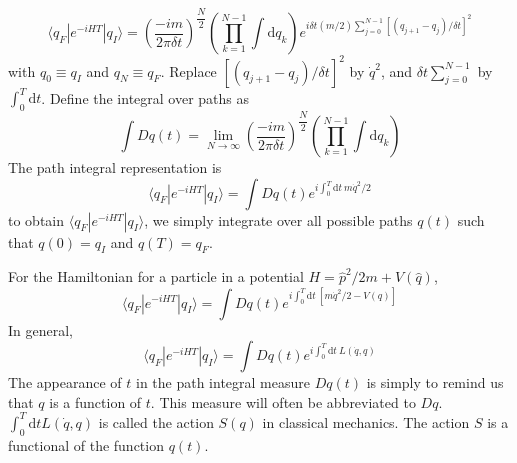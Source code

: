 \documentclass[11pt,a4paper]{article}
\newcommand{\dif}{\mathrm{d}}
\begin{document}
\begin{equation}
\langle q_F |e^{-iHT}| q_I\rangle = \left(\dfrac{-i m}{2\pi \delta t} \right)^{\dfrac{N}{2} } \left(\prod_{k=1}^{N-1} \int \dif q_k \right) e^{i\delta t(m/2)\sum\limits_{j=0}^{N-1}[(q_{j+1}-q_{j})/\delta t]^2}
\end{equation}
with $q_0 \equiv q_I$ and $q_N \equiv q_F$. Replace $[(q_{j+1}-q_j)/\delta t]^2$ by $\dot{q}^2$, and $\delta t \sum_{j=0}^{N-1}$ by $\int_0^T \dif t$. Define the integral over paths as
\begin{equation*}
\int D q(t) = \lim_{N \rightarrow \infty} \left(\dfrac{-i m}{2\pi \delta t} \right)^{\dfrac{N}{2} } \left(\prod_{k=1}^{N-1} \int \dif q_k \right)
\end{equation*}
The path integral representation is
\begin{equation}
\langle q_F |e^{-iHT}| q_I\rangle = \int D q(t) e^{i \int_0^T \dif t ~m \dot{q}^2/2}
\end{equation}
to obtain $\langle q_F |e^{-iHT}| q_I\rangle$, we simply integrate over all possible paths $q(t)$ such that $q(0) = q_I$ and $q(T) = q_F$.

For the Hamiltonian for a particle in a potential $H = \hat{p}^2/2m + V(\hat{q})$, 
\begin{equation}
\langle q_F |e^{-iHT}| q_I\rangle = \int D q(t) e^{i \int_0^T \dif t ~[m \dot{q}^2/2 -V(q)]}
\end{equation}
In general, 
\begin{equation}
\langle q_F |e^{-iHT}| q_I\rangle = \int D q(t) e^{i \int_0^T \dif t ~L(\dot{q}, q)}
\end{equation}
The appearance of $t$ in the path integral measure $Dq(t)$ is simply to remind us that $q$ is a function of $t$. This measure will often be abbreviated to $Dq$. $\int_0^T \dif t L(\dot{q}, q)$ is called the action $S(q)$ in classical mechanics. The action $S$ is a functional of the function $q(t)$.
\end{document}
